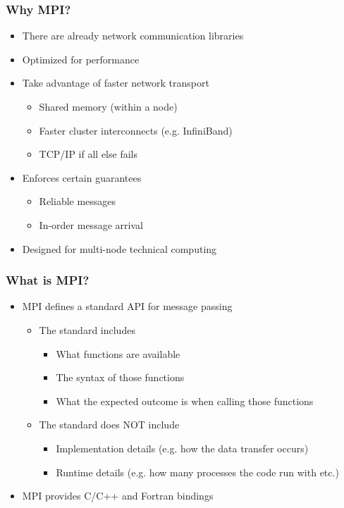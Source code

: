 \documentclass[10pt,t]{beamer}
\begin{document}
\begin{frame}
  \frametitle{Why MPI?}
  \begin{itemize}
    \item There are already network communication libraries
    \item Optimized for performance
    \item Take advantage of faster network transport
      \begin{itemize}
        \item Shared memory (within a node)
        \item Faster cluster interconnects (e.g. InfiniBand)
        \item TCP/IP if all else fails
      \end{itemize}
    \item Enforces certain guarantees
      \begin{itemize}
      \item Reliable messages
      \item In-order message arrival
      \end{itemize}
    \item Designed for multi-node technical computing
  \end{itemize}
\end{frame}

\begin{frame}
  \frametitle{What is MPI?}
  \begin{itemize}
    \item MPI defines a standard API for message passing
      \begin{itemize}
        \item The standard includes
          \begin{itemize}
          \item What functions are available
          \item The syntax of those functions
          \item What the expected outcome is when calling those functions
          \end{itemize}
        \item The standard does NOT include
          \begin{itemize}
            \item Implementation details (e.g. how the data transfer occurs)
            \item Runtime details (e.g. how many processes the code run with  etc.)
          \end{itemize}
      \end{itemize}
    \item MPI provides C/C++ and Fortran bindings
  \end{itemize}
\end{frame}
\end{document}
